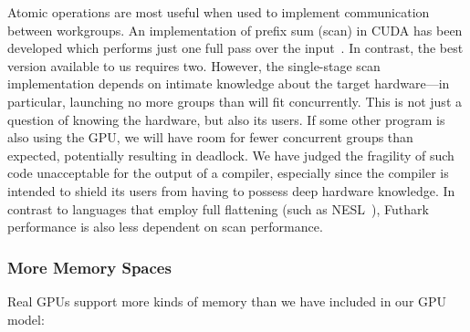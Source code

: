 Atomic operations are most useful when used to implement communication
between workgroups.  An implementation of prefix sum (scan) in CUDA
has been developed which performs just one full pass over the
input~\cite{Maleki:2016:HTM:2908080.2908089}.  In contrast, the best
version available to us requires two.  However, the single-stage scan
implementation depends on intimate knowledge about the target
hardware---in particular, launching no more groups than will fit
concurrently.  This is not just a question of knowing the hardware,
but also its users.  If some other program is also using the GPU, we
will have room for fewer concurrent groups than expected, potentially
resulting in deadlock.  We have judged the fragility of such code
unacceptable for the output of a compiler, especially since the
compiler is intended to shield its users from having to possess deep
hardware knowledge.  In contrast to languages that employ full
flattening (such as NESL~\cite{BlellochCACM96NESL}), Futhark
performance is also less dependent on scan performance.

\subsubsection{More Memory Spaces}

Real GPUs support more kinds of memory than we have included in our
GPU model:

